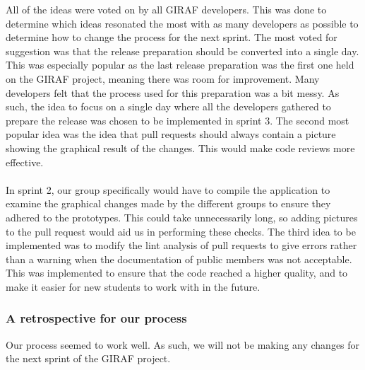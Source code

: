 \noindent
All of the ideas were voted on by all GIRAF developers.
This was done to determine which ideas resonated the most with as many developers as possible to determine how to change the process for the next sprint.
The most voted for suggestion was that the release preparation should be converted into a single day.
This was especially popular as the last release preparation was the first one held on the GIRAF project, meaning there was room for improvement.
Many developers felt that the process used for this preparation was a bit messy.
As such, the idea to focus on a single day where all the developers gathered to prepare the release was chosen to be implemented in sprint 3.
The second most popular idea was the idea that pull requests should always contain a picture showing the graphical result of the changes.
This would make code reviews more effective.
\\\\
In sprint 2, our group specifically would have to compile the application to examine the graphical changes made by the different groups to ensure they adhered to the prototypes.
This could take unnecessarily long, so adding pictures to the pull request would aid us in performing these checks.
The third idea to be implemented was to modify the lint analysis of pull requests to give errors rather than a warning when the documentation of public members was not acceptable.
This was implemented to ensure that the code reached a higher quality, and to make it easier for new students to work with in the future.

\subsubsection{A retrospective for our process}
Our process seemed to work well.
As such, we will not be making any changes for the next sprint of the GIRAF project.
